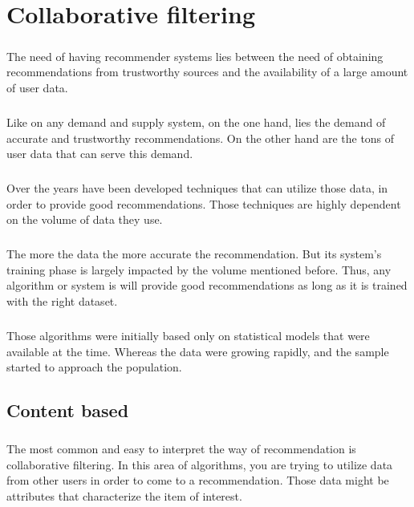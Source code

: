 \newpage
\chapter{Collaborative filtering}
\paragraph{}The need of having recommender systems lies between the need of obtaining recommendations from trustworthy sources and the availability of a large amount of user data.
\paragraph{}Like on any demand and supply system, on the one hand, lies the demand of accurate and trustworthy recommendations. On the other hand are the tons of user data that can serve this demand.
\paragraph{}Over the years have been developed techniques that can utilize those data, in order to provide good recommendations. Those techniques are highly dependent on the volume of data they use. 

\paragraph{}The more the data the more accurate the recommendation. But its system's training phase is largely impacted by the volume mentioned before. Thus, any algorithm or system is will provide good recommendations as long as it is trained with the right dataset.

\paragraph{} Those algorithms were initially based only on statistical models that were available at the time. Whereas the data were growing rapidly, and the sample started to approach the population.
\section{Content based}

\paragraph{}The most common and easy to interpret the way of recommendation is collaborative filtering. In this area of algorithms, you are trying to utilize data from other users in order to come to a recommendation. Those data might be attributes that characterize the item of interest. 
